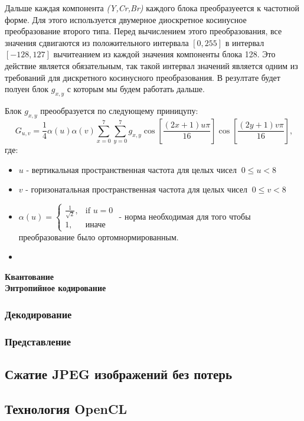 \documentclass{matmex-diploma-custom}
\begin{document}
Дальше каждая компонента \textit{(Y,Cr,Br)} каждого блока преобразуеется к  частотной форме. Для  этого используется двумерное диоскретное
косинусное преобразование второго типа. Перед вычислением этого преобразования, все значения сдвигаются из положительного интервала $[0,255]$
в интервал $[-128, 127]$ вычитеанием из каждой значения компоненты блока 128. Это действие является обязательным, так такой интервал значений является одним из требований для дискретного косинусного преобразования. В резултате будет полуен блок $g_{x,y}$ с которым мы будем работать дальше.\newline

Блок $ g_{x,y} $ преообразуется по следующему приницупу:
$$ \ G_{u,v} =
    \frac{1}{4}
    \alpha(u)
    \alpha(v)
    \sum_{x=0}^7
    \sum_{y=0}^7
    g_{x,y}
    \cos \left[\frac{(2x+1)u\pi}{16} \right]
    \cos \left[\frac{(2y+1)v\pi}{16} \right],
  $$
  где:
  \begin{itemize}
  \item{$u$ - вертикальная пространственная частота для целых чисел $\ 0 \leq u < 8$}
  \item{$v$ - горизонатальная пространственная частота для целых чисел $\ 0 \leq v < 8$}
  \item{
    $\alpha(u) =
    \begin{cases}
        \frac{1}{\sqrt{2}}, & \mbox{if }u=0 \\1, & \mbox{иначе}
    \end{cases}$
    - норма необходимая  для того чтобы преобразование было ортомнормированным.
  }
  \item{

  }
  \end{itemize}

\textbf{Квантование}\\
\textbf{Энтропийное кодирование}\\
\subsubsection{Декодирование}
\subsubsection{Представление}
\subsection{Сжатие JPEG изображений без потерь}
\subsection{Технология OpenCL}
\end{document}
